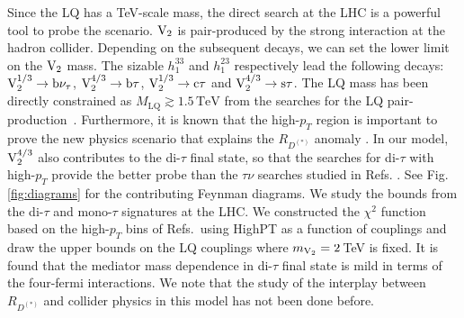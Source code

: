 \documentclass[12pt, a4paper]{article}
\numberwithin{equation}{section} %
\newcommand{\1}{\mbox{1}\hspace{-0.25em}\mbox{l}}
\begin{document}
Since the LQ has a TeV-scale mass, the direct search at the LHC is a powerful tool to probe the scenario. $\rm{V}_2$ is pair-produced by the strong interaction at the hadron collider. Depending on the subsequent decays, we can set the lower limit on the $\rm{V}_2$ mass.
The sizable $h_{1}^{33}$ and $h_{1}^{23}$ respectively lead the following decays:  $\rm{V}^{1/3}_2\to b\nu_\tau$, $\rm{V}^{4/3}_2\to b\tau$, $\rm{V}^{1/3}_2\to c\tau$ and $\rm{V}^{4/3}_2\to s\tau$.
The LQ mass has been directly constrained as $M_\text{LQ} \gtrsim 1.5\,\text{TeV}$ from the searches for the LQ pair-production~\cite{Sirunyan:2018vhk,Aaboud:2019bye,Aad:2021rrh,ATLAS:2021jyv}. 
Furthermore, it is known that the high-$p_T$ region is important to prove the new physics scenario that explains the $R_{D^{(*)}}$ anomaly \cite{Faroughy:2016osc,Iguro:2018fni,Mandal:2018kau,Greljo:2018tzh,Altmannshofer:2017poe,Iguro:2017ysu,Abdullah:2018ets,Marzocca:2020ueu,Iguro:2020keo,Endo:2021lhi}.
In our model, $\rm{V}^{4/3}_2$ also contributes to the di-$\tau$ final state, so that the searches for di-$\tau$ with high-$p_T$ \cite{CMS:2022goy,ATLAS:2020zms} provide the better probe than the $\tau\nu$ searches studied in Refs. \cite{CMS:2015hmx,Aaboud:2018vgh,Sirunyan:2018lbg,ATLAS:2021bjk}. 
See Fig.\,\ref{fig:diagrams} for the contributing Feynman diagrams.
We study the bounds from the  di-$\tau$ and mono-$\tau$ signatures at the LHC.
We constructed the $\chi^2$ function based on the high-$p_T$ bins of Refs.\,\cite{ATLAS:2020zms,ATLAS:2021bjk}
using HighPT \cite{Allwicher:2022mcg} as a function of couplings and draw the upper bounds on the LQ couplings where $m_{\rm{V}_2}=2\,$TeV is fixed.
It is found that the mediator mass dependence in di-$\tau$ final state is mild in terms of the four-fermi interactions.
We note that the study of the interplay between $R_{D^{(*)}}$ and collider physics in this model has not been done before.
\end{document}

